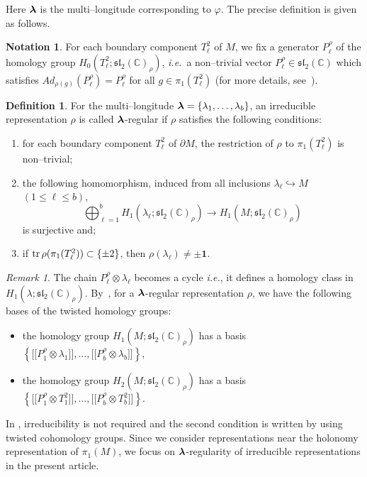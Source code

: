 \documentclass[a4paper]{amsart}
\theoremstyle{plain}
\theoremstyle{definition}
\newtheorem{definition}{Definition}
\newtheorem*{notation*}{Notation}
\theoremstyle{remark}
\newtheorem{remark}{Remark}%
\newcommand{\ie}{\emph{i.e.}}
\newcommand{\myleq}{\leqslant}
\newcommand{\CC}{{\mathbb C}}
\newcommand{\trace}{{\rm tr}\,}
\newcommand{\I}{\mathbf{1}}
\newcommand{\bm}[1]{\mbox{\boldmath $#1$}}
\newcommand{\sll}{\mathfrak{sl}_2(\CC)}
\newcommand{\sllrho}{\mathfrak{sl}_2(\CC)_\rho}
\newcommand{\bbrack}[1]{\lbrack \! \lbrack #1 \rbrack \! \rbrack}
\newcommand{\bord}{\partial}
\begin{document}
Here $\bm{\lambda}$ is the multi--longitude corresponding to $\varphi$.
The precise definition is given as follows.

\begin{notation*}
  For each boundary component $T^2_\ell$ of $M$, we fix a generator
  $P_\ell^\rho$ of the homology group $H_0(T^2_\ell; \sllrho)$, \ie~a
  non--trivial vector $P_\ell^\rho \in \sll$ which satisfies
  $Ad_{\rho(g)}(P_\ell^\rho) = P_\ell^\rho$ for all $g \in \pi_1(T^2_\ell)$
  (for more details, see~\cite[Section 3.3.1]{Porti:1997}).
\end{notation*}

\begin{definition}
  For the multi--longitude $\bm{\lambda} = \{\lambda_1, \ldots,
  \lambda_b\}$, an irreducible representation $\rho$ is called
  $\bm{\lambda}$-regular if $\rho$ satisfies the following conditions:
  \begin{enumerate}
  \item for each boundary component $T^2_\ell$ of $\bord M$, the restriction of
    $\rho$ to $\pi_1(T^2_\ell)$ is non--trivial;
  \item the following homomorphism, induced from all inclusions $\lambda_\ell \hookrightarrow M$ $(1 \myleq \ell \myleq b)$,
    $$\mathop{\bigoplus}_{\ell = 1}^b H_1(\lambda_{\ell};\sllrho) \to H_1(M;\sllrho)$$
    is surjective and;
  \item if $\trace \rho(\pi_1(T^2_\ell)) \subset \{\pm 2\}$, 
     then
    $\rho(\lambda_{\ell}) \not = \pm \I$.
  \end{enumerate}
\end{definition}

\begin{remark}
  The chain $P^\rho_\ell \otimes \lambda_{\ell}$ becomes a cycle \ie,
  it defines a homology class in $H_1(\lambda;\sllrho)$.
  By~\cite[Proposition 3.22 and Corollaire 3.21]{Porti:1997}, for a
  $\bm{\lambda}$-regular representation $\rho$, we have the following
  bases of the twisted homology groups:
  \begin{itemize}
  \item the homology group $H_1(M;\sllrho)$ has a basis $\left\{
    \bbrack{P^\rho_1 \otimes \lambda_1}, \ldots, \bbrack{P^\rho_b \otimes \lambda_b} \right\}$,
  \item the homology group $H_2(M;\sllrho)$ has a basis  $\left\{
    \bbrack{P^\rho_1\otimes T^2_1}, \ldots, \bbrack{P^\rho_b \otimes T^2_b} \right\}$.
  \end{itemize}
In \cite[Definition 3.21]{Porti:1997}, irreducibility is not required and the second condition is written by using 
twisted cohomology groups.
Since we consider representations near the holonomy representation of $\pi_1(M)$,
 we focus on $\bm{\lambda}$-regularity of irreducible representations in the present article.
\end{remark}
\end{document}
